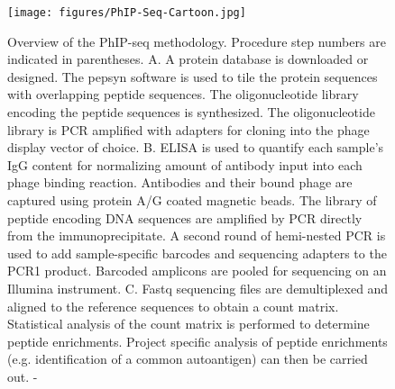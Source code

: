 \documentclass{article}
\begin{document}
\begin{figure}[h]
\centering
\texttt{[image: figures/PhIP-Seq-Cartoon.jpg]}
    \caption{Overview of the PhIP-seq methodology. Procedure step numbers are indicated in parentheses. A. A protein database is downloaded or designed. The pepsyn software is used to tile the protein sequences with overlapping peptide sequences. The oligonucleotide library encoding the peptide sequences is synthesized. The oligonucleotide library is PCR amplified with adapters for cloning into the phage display vector of choice. B. ELISA is used to quantify each sample’s IgG content for normalizing amount of antibody input into each phage binding reaction. Antibodies and their bound phage are captured using protein A/G coated magnetic beads. The library of peptide encoding DNA sequences are amplified by PCR directly from the immunoprecipitate. A second round of hemi-nested PCR is used to add sample-specific barcodes and sequencing adapters to the PCR1 product. Barcoded amplicons are pooled for sequencing on an Illumina instrument. C. Fastq sequencing files are demultiplexed and aligned to the reference sequences to obtain a count matrix. Statistical analysis of the count matrix is performed to determine peptide enrichments. Project specific analysis of peptide enrichments (e.g. identification of a common autoantigen) can then be carried out. - \citep{Mohan2018}}
\label{fig:PhIP-Seq-Cartoon}
\end{figure}
\end{document}
